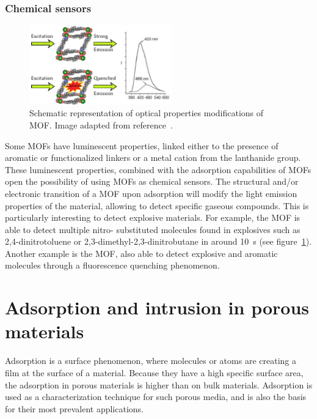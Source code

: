 \documentclass[thesis]{subfiles}
\begin{document}
\subsubsection{Chemical sensors}

\begin{figure}[ht]
    \centering
    \includegraphics[width=0.55\textwidth]{figures/cited/chemical-sensor}
    \caption{Schematic representation of optical properties modifications of
     MOF. Image adapted from reference~\cite{Lan2009}.}
    \label{fig:chemical-sensor}
\end{figure}

Some MOFs have luminescent properties, linked either to the presence of aromatic
or functionalized linkers or a metal cation from the lanthanide group. These
luminescent properties, combined with the adsorption capabilities of MOFs open
the possibility of using MOFs as chemical sensors. The structural and/or
electronic transition of a MOF upon adsorption will modify the light emission
properties of the material, allowing to detect specific gaseous compounds. This
is particularly interesting to detect explosive materials. For example, the
 MOF is able to detect multiple nitro- substituted
molecules found in explosives such as 2,4-dinitrotoluene or
2,3-dimethyl-2,3-dinitrobutane in around \SI{10}{s}\cite{Lan2009} (see
figure~\ref{fig:chemical-sensor}). Another example is the 
MOF, also able to detect explosive and aromatic molecules through a fluorescence
quenching phenomenon\cite{Pramanik2011}.

\newpage
\section{Adsorption and intrusion in porous materials}

Adsorption is a surface phenomenon, where molecules or atoms are creating a film
at the surface of a material. Because they have a high specific surface area,
the adsorption in porous materials is higher than on bulk materials. Adsorption
is used as a characterization technique for such porous media, and is also the
basis for their most prevalent applications.
\end{document}
